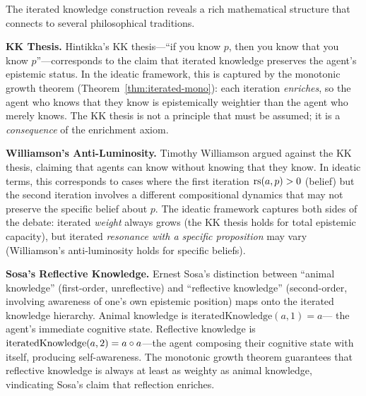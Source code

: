 \begin{remark}
The iterated knowledge construction reveals a rich mathematical structure that
connects to several philosophical traditions.

\textbf{KK Thesis.} Hintikka's KK thesis---``if you know $p$, then you know
that you know $p$''---corresponds to the claim that iterated knowledge preserves
the agent's epistemic status. In the ideatic framework, this is captured by the
monotonic growth theorem (Theorem~\ref{thm:iterated-mono}): each iteration
\emph{enriches}, so the agent who knows that they know is epistemically weightier
than the agent who merely knows. The KK thesis is not a principle that must be
assumed; it is a \emph{consequence} of the enrichment axiom.

\textbf{Williamson's Anti-Luminosity.} Timothy Williamson argued against the KK
thesis, claiming that agents can know without knowing that they know. In ideatic
terms, this corresponds to cases where the first iteration $\mathrm{rs}(a, p) > 0$ (belief)
but the second iteration involves a different compositional dynamics that may not
preserve the specific belief about $p$. The ideatic framework captures both sides
of the debate: iterated \emph{weight} always grows (the KK thesis holds for
total epistemic capacity), but iterated \emph{resonance with a specific proposition}
may vary (Williamson's anti-luminosity holds for specific beliefs).

\textbf{Sosa's Reflective Knowledge.} Ernest Sosa's distinction between ``animal
knowledge'' (first-order, unreflective) and ``reflective knowledge'' (second-order,
involving awareness of one's own epistemic position) maps onto the iterated
knowledge hierarchy. Animal knowledge is $\mathrm{iteratedKnowledge}(a, 1) = a$---
the agent's immediate cognitive state. Reflective knowledge is
$\mathrm{iteratedKnowledge}(a, 2) = a \circ a$---the agent composing their
cognitive state with itself, producing self-awareness. The monotonic growth theorem
guarantees that reflective knowledge is always at least as weighty as animal
knowledge, vindicating Sosa's claim that reflection enriches.
\end{remark}


